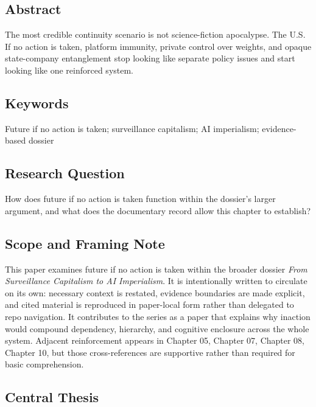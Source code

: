 \documentclass[
  american,
  11pt,
  letterpaper,
]{article}
\begin{document}
\subsection{Abstract}\label{abstract-9}

The most credible continuity scenario is not science-fiction apocalypse.
The U.S. If no action is taken, platform immunity, private control over
weights, and opaque state-company entanglement stop looking like
separate policy issues and start looking like one reinforced system.

\subsection{Keywords}\label{keywords-9}

Future if no action is taken; surveillance capitalism; AI imperialism;
evidence-based dossier

\subsection{Research Question}\label{research-question-9}

How does future if no action is taken function within the dossier's
larger argument, and what does the documentary record allow this chapter
to establish?

\subsection{Scope and Framing Note}\label{scope-and-framing-note-9}

This paper examines future if no action is taken within the broader
dossier \emph{From Surveillance Capitalism to AI Imperialism}. It is
intentionally written to circulate on its own: necessary context is
restated, evidence boundaries are made explicit, and cited material is
reproduced in paper-local form rather than delegated to repo navigation.
It contributes to the series as a paper that explains why inaction would
compound dependency, hierarchy, and cognitive enclosure across the whole
system. Adjacent reinforcement appears in Chapter 05, Chapter 07,
Chapter 08, Chapter 10, but those cross-references are supportive rather
than required for basic comprehension.

\subsection{Central Thesis}\label{central-thesis-9}
\end{document}
